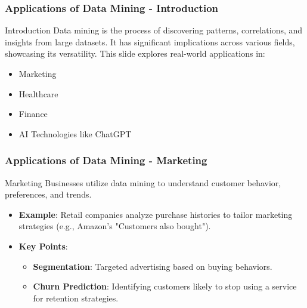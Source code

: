 \documentclass[aspectratio=169]{beamer}
\begin{document}
\begin{frame}[fragile]
    \frametitle{Applications of Data Mining - Introduction}
    \begin{block}{Introduction}
        Data mining is the process of discovering patterns, correlations, and insights from large datasets. It has significant implications across various fields, showcasing its versatility. This slide explores real-world applications in:
    \end{block}
    \begin{itemize}
        \item Marketing
        \item Healthcare
        \item Finance
        \item AI Technologies like ChatGPT
    \end{itemize}
\end{frame}

\begin{frame}[fragile]
    \frametitle{Applications of Data Mining - Marketing}
    \begin{block}{Marketing}
        Businesses utilize data mining to understand customer behavior, preferences, and trends.
    \end{block}
    \begin{itemize}
        \item \textbf{Example}: Retail companies analyze purchase histories to tailor marketing strategies (e.g., Amazon's "Customers also bought").
        \item \textbf{Key Points}:
            \begin{itemize}
                \item \textbf{Segmentation}: Targeted advertising based on buying behaviors.
                \item \textbf{Churn Prediction}: Identifying customers likely to stop using a service for retention strategies.
            \end{itemize}
    \end{itemize}
\end{frame}
\end{document}
